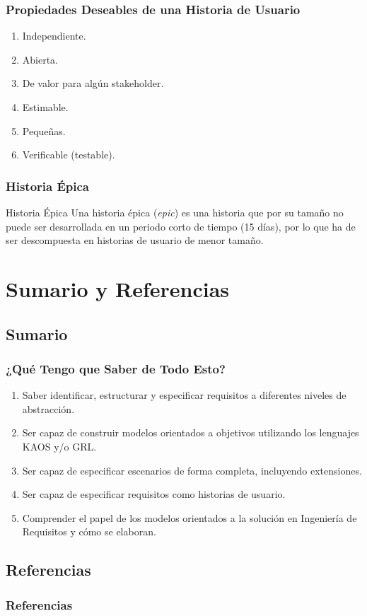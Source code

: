 \documentclass[handout,slidestop,xcolor=pst,dvips,blue]{beamer}
\begin{document}
\begin{frame}[c]
	\frametitle{Propiedades Deseables de una Historia de Usuario}
	\begin{enumerate}[<+->]
		\item Independiente.
        \item Abierta.
        \item De valor para algún stakeholder.
        \item Estimable.
        \item Pequeñas.
        \item Verificable (testable).
	\end{enumerate}
\end{frame}

\begin{frame}[c]
	\frametitle{Historia Épica}
	\begin{block}{Historia Épica}
        Una historia épica (\emph{epic}) es una historia que por su tamaño no puede ser desarrollada en un periodo corto de tiempo (15 días), por lo que ha de ser descompuesta en historias de usuario de menor tamaño.
	\end{block}
\end{frame}

\section{Sumario y Referencias}

\subsection{Sumario}

\begin{frame}[c]
    \frametitle{¿Qué Tengo que Saber de Todo Esto?}
    \begin{enumerate}[<+->]
        \item Saber identificar, estructurar y especificar requisitos a diferentes niveles de abstracción.
        \item Ser capaz de construir modelos orientados a objetivos utilizando los lenguajes KAOS y/o GRL.
        \item Ser capaz de especificar escenarios de forma completa, incluyendo extensiones.
        \item Ser capaz de especificar requisitos como historias de usuario.
        \item Comprender el papel de los modelos orientados a la solución en Ingeniería de Requisitos y cómo se elaboran.
    \end{enumerate}
\end{frame}

\subsection{Referencias}
%
\begin{frame}
	\frametitle{Referencias}
	
	
\end{frame}
\end{document}
